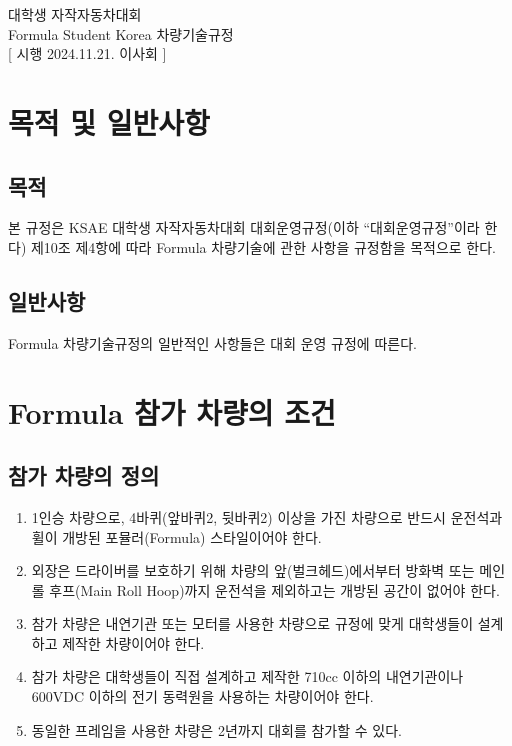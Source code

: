 \documentclass[a4paper,10pt]{report}
\begin{document}
\begin{center}
  {\fontsize{22}{25}\selectfont\pretendardb 대학생 자작자동차대회}\\[2.5ex]
  {\fontsize{22}{25}\selectfont\pretendardb Formula Student Korea 차량기술규정}\\[2.5ex]
  [ 시행 2024.11.21. 이사회 ]
\end{center}

\chapter{목적 및 일반사항}

\section{목적}
본 규정은 KSAE 대학생 자작자동차대회 대회운영규정(이하 “대회운영규정”이라 한다) 제10조 제4항에 따라 Formula 차량기술에 관한 사항을 규정함을 목적으로 한다.

\section{일반사항}

Formula 차량기술규정의 일반적인 사항들은 대회 운영 규정에 따른다.

\chapter{Formula 참가 차량의 조건}

\section{참가 차량의 정의}

\begin{enumerate}
  \item 1인승 차량으로, 4바퀴(앞바퀴2, 뒷바퀴2) 이상을 가진 차량으로 반드시 운전석과 휠이 개방된 포뮬러(Formula) 스타일이어야 한다.
  \item 외장은 드라이버를 보호하기 위해 차량의 앞(벌크헤드)에서부터 방화벽 또는 메인 롤 후프(Main Roll Hoop)까지 운전석을 제외하고는 개방된 공간이 없어야 한다.
  \item 참가 차량은 내연기관 또는 모터를 사용한 차량으로 규정에 맞게 대학생들이 설계하고 제작한 차량이어야 한다.
  \item 참가 차량은 대학생들이 직접 설계하고 제작한 710cc 이하의 내연기관이나 600VDC 이하의 전기 동력원을 사용하는 차량이어야 한다.
  \item 동일한 프레임을 사용한 차량은 2년까지 대회를 참가할 수 있다. 
\end{enumerate}
\end{document}
